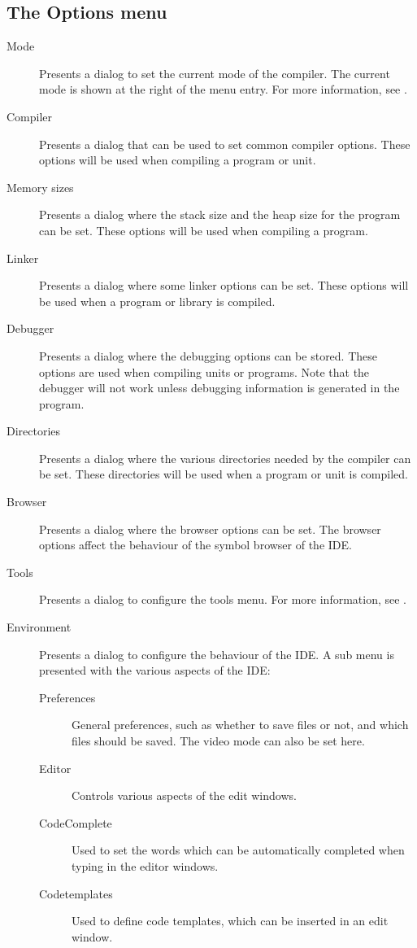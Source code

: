 \subsection{The Options menu}
\label{se:menuoptions}
\begin{description}
\item[Mode] Presents a dialog to set the current mode of the compiler. The
current mode is shown at the right of the menu entry. For more information,
see .
\item[Compiler] Presents a dialog that can be used to set common compiler
options. These options will be used when compiling a program or unit.
\item[Memory sizes]
Presents a dialog where the stack size and the heap size for the program can
be set. These options will be used when compiling a program.
\item[Linker]
Presents a dialog where some linker options can be set. These options will
be used when a program or library is compiled.
\item[Debugger]
Presents a dialog where the debugging options can be stored. These options
are used when compiling units or programs. Note that the debugger will not
work unless debugging information is generated in the program.
\item[Directories]
Presents a dialog where the various directories needed by the compiler can
be set. These directories will be used when a program or unit is compiled.
\item[Browser]
Presents a dialog where the browser options can be set. The browser options
affect the behaviour of the symbol browser of the IDE. 
\item[Tools]
Presents a dialog to configure the tools menu. For more information, see
.
\item[Environment]
Presents a dialog to configure the behaviour of the IDE. A sub menu is
presented with the various aspects of the IDE:
\begin{description}
\item[Preferences]
General preferences, such as whether to save files or not, and which files
should be saved. The video mode can also be set here.
\item[Editor]
Controls various aspects of the edit windows.
\item[CodeComplete]
Used to set the words which can be automatically completed when typing in
the editor windows.
\item[Codetemplates]
Used to define code templates, which can be inserted in an edit window.

\end{description}
\end{description}
